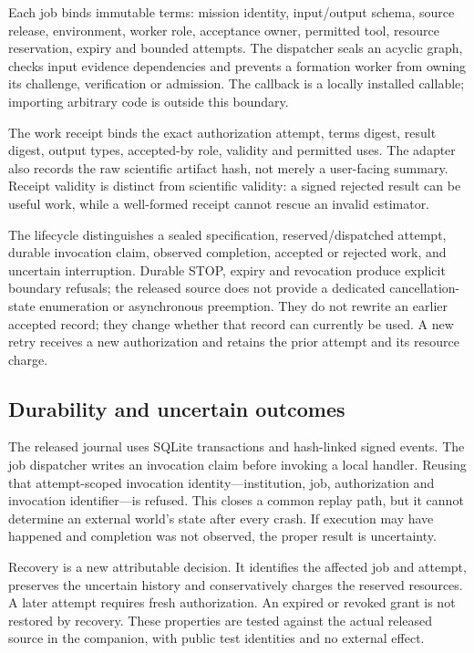 \documentclass[11pt]{article}
\begin{document}
Each job binds immutable terms: mission identity, input/output schema, source release, environment, worker role, acceptance owner, permitted tool, resource reservation, expiry and bounded attempts. The dispatcher seals an acyclic graph, checks input evidence dependencies and prevents a formation worker from owning its challenge, verification or admission. The callback is a locally installed callable; importing arbitrary code is outside this boundary.

The work receipt binds the exact authorization attempt, terms digest, result digest, output types, accepted-by role, validity and permitted uses. The adapter also records the raw scientific artifact hash, not merely a user-facing summary. Receipt validity is distinct from scientific validity: a signed rejected result can be useful work, while a well-formed receipt cannot rescue an invalid estimator.

The lifecycle distinguishes a sealed specification, reserved/dispatched attempt, durable invocation claim, observed completion, accepted or rejected work, and uncertain interruption. Durable STOP, expiry and revocation produce explicit boundary refusals; the released source does not provide a dedicated cancellation-state enumeration or asynchronous preemption. They do not rewrite an earlier accepted record; they change whether that record can currently be used. A new retry receives a new authorization and retains the prior attempt and its resource charge.

\subsection{Durability and uncertain outcomes}

The released journal uses SQLite transactions and hash-linked signed events. The job dispatcher writes an invocation claim before invoking a local handler. Reusing that attempt-scoped invocation identity---institution, job, authorization and invocation identifier---is refused. This closes a common replay path, but it cannot determine an external world's state after every crash. If execution may have happened and completion was not observed, the proper result is uncertainty.

Recovery is a new attributable decision. It identifies the affected job and attempt, preserves the uncertain history and conservatively charges the reserved resources. A later attempt requires fresh authorization. An expired or revoked grant is not restored by recovery. These properties are tested against the actual released source in the companion, with public test identities and no external effect.
\end{document}

